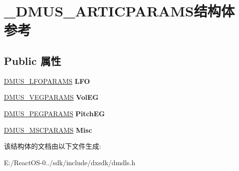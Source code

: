 \hypertarget{struct___d_m_u_s___a_r_t_i_c_p_a_r_a_m_s}{}\section{\+\_\+\+D\+M\+U\+S\+\_\+\+A\+R\+T\+I\+C\+P\+A\+R\+A\+M\+S结构体 参考}
\label{struct___d_m_u_s___a_r_t_i_c_p_a_r_a_m_s}
\subsection*{Public 属性}
\begin{DoxyCompactItemize}
\item 
\mbox{\label{struct___d_m_u_s___a_r_t_i_c_p_a_r_a_m_s_a244752407f50a4970b2d22a550b634f5}} 
\hyperlink{struct___d_m_u_s___l_f_o_p_a_r_a_m_s}{D\+M\+U\+S\+\_\+\+L\+F\+O\+P\+A\+R\+A\+MS} {\bfseries L\+FO}
\item 
\mbox{\label{struct___d_m_u_s___a_r_t_i_c_p_a_r_a_m_s_a740704944d4f1cc1672a4ea4425289c2}} 
\hyperlink{struct___d_m_u_s___v_e_g_p_a_r_a_m_s}{D\+M\+U\+S\+\_\+\+V\+E\+G\+P\+A\+R\+A\+MS} {\bfseries Vol\+EG}
\item 
\mbox{\label{struct___d_m_u_s___a_r_t_i_c_p_a_r_a_m_s_a987e2332cd587a23e9cea71a709cfcc8}} 
\hyperlink{struct___d_m_u_s___p_e_g_p_a_r_a_m_s}{D\+M\+U\+S\+\_\+\+P\+E\+G\+P\+A\+R\+A\+MS} {\bfseries Pitch\+EG}
\item 
\mbox{\label{struct___d_m_u_s___a_r_t_i_c_p_a_r_a_m_s_a250fd7207e5dae456ed570a1173b4684}} 
\hyperlink{struct___d_m_u_s___m_s_c_p_a_r_a_m_s}{D\+M\+U\+S\+\_\+\+M\+S\+C\+P\+A\+R\+A\+MS} {\bfseries Misc}
\end{DoxyCompactItemize}


该结构体的文档由以下文件生成\+:\begin{DoxyCompactItemize}
\item 
E\+:/\+React\+O\+S-\/0../sdk/include/dxsdk/dmdls.\+h\end{DoxyCompactItemize}
